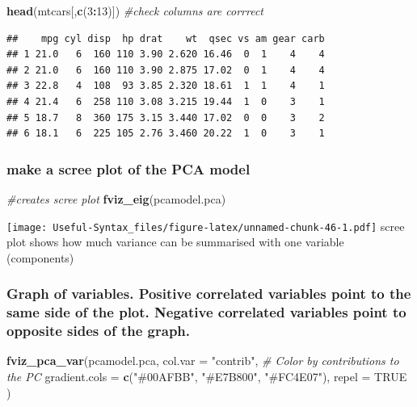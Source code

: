 \documentclass[
]{article}
\newenvironment{Shaded}{\begin{snugshade}}{\end{snugshade}}
\newcommand{\AttributeTok}[1]{\textcolor[rgb]{0.13,0.29,0.53}{#1}}
\newcommand{\CommentTok}[1]{\textcolor[rgb]{0.56,0.35,0.01}{\textit{#1}}}
\newcommand{\ConstantTok}[1]{\textcolor[rgb]{0.56,0.35,0.01}{#1}}
\newcommand{\DecValTok}[1]{\textcolor[rgb]{0.00,0.00,0.81}{#1}}
\newcommand{\FunctionTok}[1]{\textcolor[rgb]{0.13,0.29,0.53}{\textbf{#1}}}
\newcommand{\NormalTok}[1]{#1}
\newcommand{\SpecialCharTok}[1]{\textcolor[rgb]{0.81,0.36,0.00}{\textbf{#1}}}
\newcommand{\StringTok}[1]{\textcolor[rgb]{0.31,0.60,0.02}{#1}}
\begin{document}
\begin{Shaded}
\begin{Highlighting}[]
\FunctionTok{head}\NormalTok{(mtcars[,}\FunctionTok{c}\NormalTok{(}\DecValTok{3}\SpecialCharTok{:}\DecValTok{13}\NormalTok{)]) }\CommentTok{\#check columns are corrrect}
\end{Highlighting}
\end{Shaded}

\begin{verbatim}
##    mpg cyl disp  hp drat    wt  qsec vs am gear carb
## 1 21.0   6  160 110 3.90 2.620 16.46  0  1    4    4
## 2 21.0   6  160 110 3.90 2.875 17.02  0  1    4    4
## 3 22.8   4  108  93 3.85 2.320 18.61  1  1    4    1
## 4 21.4   6  258 110 3.08 3.215 19.44  1  0    3    1
## 5 18.7   8  360 175 3.15 3.440 17.02  0  0    3    2
## 6 18.1   6  225 105 2.76 3.460 20.22  1  0    3    1
\end{verbatim}

\hypertarget{make-a-scree-plot-of-the-pca-model}{%
\subsubsection{make a scree plot of the PCA model}\label{make-a-scree-plot-of-the-pca-model}}

\begin{Shaded}
\begin{Highlighting}[]
\CommentTok{\#creates scree plot}
\FunctionTok{fviz\_eig}\NormalTok{(pcamodel.pca)}
\end{Highlighting}
\end{Shaded}

\texttt{[image: Useful-Syntax\_files/figure-latex/unnamed-chunk-46-1.pdf]}
scree plot shows how much variance can be summarised with one variable (components)

\hypertarget{graph-of-variables.-positive-correlated-variables-point-to-the-same-side-of-the-plot.-negative-correlated-variables-point-to-opposite-sides-of-the-graph.}{%
\subsubsection{Graph of variables. Positive correlated variables point to the same side of the plot. Negative correlated variables point to opposite sides of the graph.}\label{graph-of-variables.-positive-correlated-variables-point-to-the-same-side-of-the-plot.-negative-correlated-variables-point-to-opposite-sides-of-the-graph.}}

\begin{Shaded}
\begin{Highlighting}[]
\FunctionTok{fviz\_pca\_var}\NormalTok{(pcamodel.pca,}
             \AttributeTok{col.var =} \StringTok{"contrib"}\NormalTok{, }\CommentTok{\# Color by contributions to the PC}
             \AttributeTok{gradient.cols =} \FunctionTok{c}\NormalTok{(}\StringTok{"\#00AFBB"}\NormalTok{, }\StringTok{"\#E7B800"}\NormalTok{, }\StringTok{"\#FC4E07"}\NormalTok{),}
             \AttributeTok{repel =} \ConstantTok{TRUE}\NormalTok{   )}
\end{Highlighting}
\end{Shaded}
\end{document}
